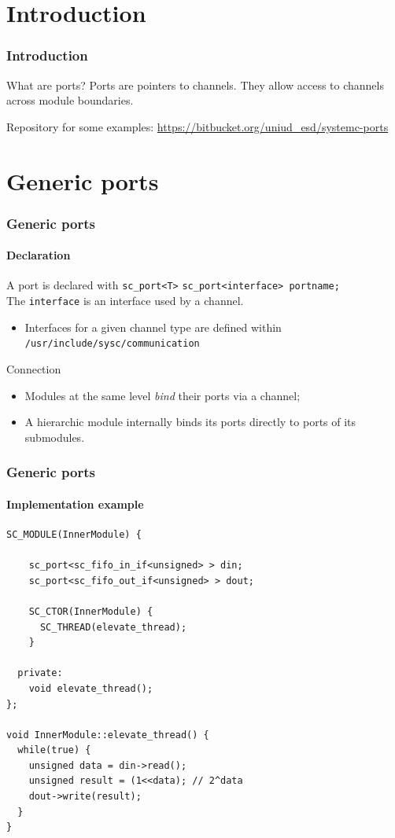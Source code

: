 \section{Introduction}

\begin{frame}
\frametitle{Introduction}
\begin{block}{What are ports?}
Ports are pointers to channels. They allow access to channels across module boundaries.
\end{block}
\pause
\begin{block}{Repository for some examples:}
\url{https://bitbucket.org/uniud_esd/systemc-ports}
\end{block}
\end{frame}

\section{Generic ports}

\begin{frame}[fragile]
\frametitle{Generic ports}
\framesubtitle{Declaration}
\begin{block}{A port is declared with \texttt{sc\_port<T>}}
\texttt{sc\_port<interface> portname;} \\
\medskip
The \texttt{interface} is an interface used by a channel. 
\begin{itemize}
\item Interfaces for a given channel type are
defined within \texttt{/usr/include/sysc/communication}
\end{itemize}
\end{block}
\pause
\begin{block}{Connection}
\begin{itemize}
\item Modules at the same level {\em bind} their ports via a channel;
\item A hierarchic module internally binds its ports directly to ports of its submodules.
\end{itemize}
\end{block}
\end{frame}

\begin{frame}[fragile]
\frametitle{Generic ports}
\framesubtitle{Implementation example}
{\scriptsize 
\begin{verbatim}
SC_MODULE(InnerModule) {

    sc_port<sc_fifo_in_if<unsigned> > din;
    sc_port<sc_fifo_out_if<unsigned> > dout;

    SC_CTOR(InnerModule) {
      SC_THREAD(elevate_thread);
    }

  private:
    void elevate_thread();
};

void InnerModule::elevate_thread() {
  while(true) {
    unsigned data = din->read();
    unsigned result = (1<<data); // 2^data
    dout->write(result);
  }
}
\end{verbatim}
}
\vspace{-1em}
\end{frame}

